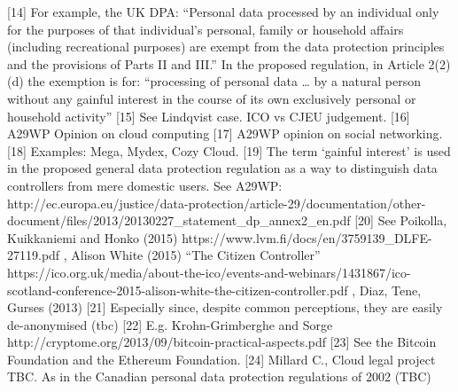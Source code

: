 \documentclass{acm_proc_article-sp}
\begin{document}
[14] For example, the UK DPA: “Personal data processed by an individual only for the purposes of that individual’s personal, family or household affairs (including recreational purposes) are exempt from the data protection principles and the provisions of Parts II and III.” In the proposed regulation, in Article 2(2)(d) the exemption is for: “processing of personal data … by a natural person without any gainful interest in the course of its own exclusively personal or household activity”
[15] See Lindqvist case. ICO vs CJEU judgement.
[16] A29WP Opinion on cloud computing
[17] A29WP opinion on social networking.
[18] Examples: Mega, Mydex, Cozy Cloud.
[19] The term ‘gainful interest’ is used in the proposed general data protection regulation as a way to distinguish data controllers from mere domestic users. See A29WP: http://ec.europa.eu/justice/data-protection/article-29/documentation/other-document/files/2013/20130227_statement_dp_annex2_en.pdf
[20] See Poikolla, Kuikkaniemi and Honko (2015) https://www.lvm.fi/docs/en/3759139_DLFE-27119.pdf , Alison White (2015) “The Citizen Controller” https://ico.org.uk/media/about-the-ico/events-and-webinars/1431867/ico-scotland-conference-2015-alison-white-the-citizen-controller.pdf , Diaz, Tene, Gurses (2013)  
[21] Especially since, despite common perceptions, they are easily de-anonymised (tbc)
[22] E.g. Krohn-Grimberghe and Sorge http://cryptome.org/2013/09/bitcoin-practical-aspects.pdf
[23] See the Bitcoin Foundation and the Ethereum Foundation.
[24] Millard C., Cloud legal project TBC. As in the Canadian personal data protection regulations of 2002 (TBC)





\end{document}
